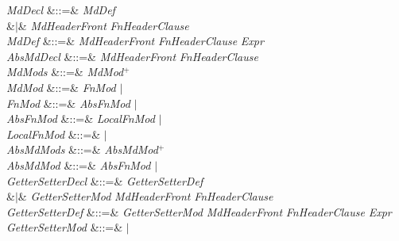 
\begin{Grammar}
\emph{MdDecl} &::=& \emph{MdDef} \\
&$|$&
  
\emph{MdHeaderFront} \emph{FnHeaderClause} \\

\emph{MdDef}  &::=&  
\emph{MdHeaderFront} \emph{FnHeaderClause}
\EXP{=} \emph{Expr} \\

\emph{AbsMdDecl} &::=&
  
\emph{MdHeaderFront} \emph{FnHeaderClause} \\

\emph{MdMods} &::=& \emph{MdMod}$^+$\\

\emph{MdMod} &::=& \emph{FnMod} $|$ \\

\emph{FnMod} &::=& \emph{AbsFnMod} $|$ \\

\emph{AbsFnMod} &::=& \emph{LocalFnMod} $|$
\\

\emph{LocalFnMod} &::=&  $|$ \\

\emph{AbsMdMods} &::=& \emph{AbsMdMod}$^+$\\

\emph{AbsMdMod} &::=& \emph{AbsFnMod} $|$ \\

\emph{GetterSetterDecl} &::=& \emph{GetterSetterDef} \\
&$|$&  
\emph{GetterSetterMod} \emph{MdHeaderFront} \emph{FnHeaderClause} \\

\emph{GetterSetterDef}  &::=&  \emph{GetterSetterMod}
\emph{MdHeaderFront} \emph{FnHeaderClause}
\EXP{=} \emph{Expr} \\

\emph{GetterSetterMod} &::=&  $|$ \\


\end{Grammar}
